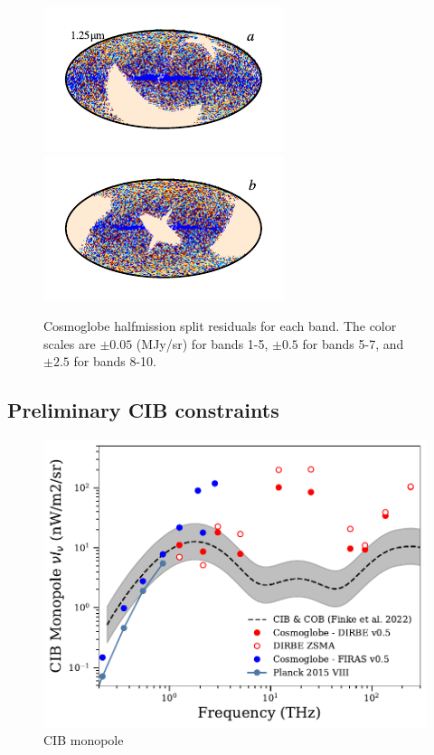 \documentclass{aa}
\begin{document}
\begin{figure}
	\includegraphics{figs/res_maps/res_01a_c0001_000022.pdf}\includegraphics{figs/res_maps/res_01b_c0001_000022.pdf}
  \vspace*{-0.85cm}

	\caption{Cosmoglobe halfmission split residuals for each band. The color scales are $\pm 0.05$ (MJy/sr) for bands 1-5, $\pm 0.5$ for bands 5-7, and $\pm 2.5$ for bands 8-10.}
	\label{fig:res}
\end{figure}

\clearpage
\subsection{Preliminary CIB constraints}



\begin{figure}
	\centering
	\includegraphics[width=\linewidth]{figs/CIB_THz.pdf}
	\caption{CIB monopole}
	\label{fig:CIB_mono}
\end{figure}
\end{document}
